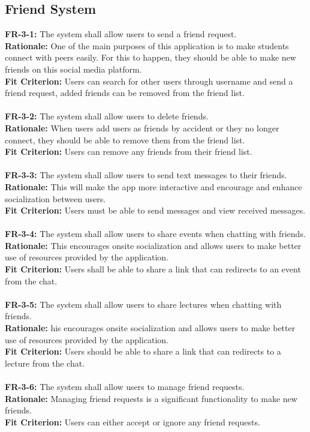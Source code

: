 \documentclass[12pt]{article}
\begin{document}
\subsection{Friend System}
    \textbf{FR-3-1:} The system shall allow users to send a friend request.\\
    \textbf{Rationale:} One of the main purposes of this application is to make students connect with peers easily. For this to happen, they should be able to make new friends on this social media platform.\\
    \textbf{Fit Criterion:} Users can search for other users through username and send a friend request, added friends can be removed from the friend list.\\\\
    \textbf{FR-3-2:} The system shall allow users to delete friends.\\
    \textbf{Rationale:} When users add users as friends by accident or they no longer connect, they should be able to remove them from the friend list.\\
    \textbf{Fit Criterion:} Users can remove any friends from their friend list.\\\\
    \textbf{FR-3-3:} The system shall allow users to send text messages to their friends.\\
    \textbf{Rationale:} This will make the app more interactive and encourage and enhance socialization between users.\\
    \textbf{Fit Criterion:} Users must be able to send messages and view received messages.\\\\
    \textbf{FR-3-4:} The system shall allow users to share events when chatting with friends.\\
    \textbf{Rationale:} This encourages onsite socialization and allows users to make better use of resources provided by the application.\\
    \textbf{Fit Criterion:} Users shall be able to share a link that can redirects to an event from the chat.\\\\
    \textbf{FR-3-5:} The system shall allow users to share lectures when chatting with friends.\\
    \textbf{Rationale:} his encourages onsite socialization and allows users to make better use of resources provided by the application.\\
    \textbf{Fit Criterion:} Users should be able to share a link that can redirects to a lecture from the chat.\\\\
    \textbf{FR-3-6:} The system shall allow users to manage friend requests.\\
    \textbf{Rationale:} Managing friend requests is a significant functionality to make new friends.\\
    \textbf{Fit Criterion:} Users can either accept or ignore any friend requests.\\\\
\end{document}
